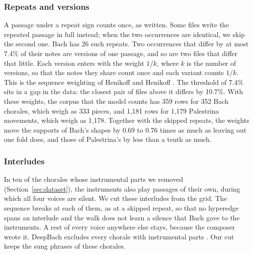 \subsubsection{Repeats and versions}
A passage under a repeat sign counts once, as written. Some files write the repeated passage in full instead; when the two occurrences are identical, we skip the second one. Bach has 26 such repeats. Two occurrences that differ by at most 7.4\% of their notes are versions of one passage, and so are two files that differ that little. Each version enters with the weight $1/k$, where $k$ is the number of versions, so that the notes they share count once and each variant counts $1/k$. This is the sequence weighting of Henikoff and Henikoff \cite{henikoff1994}. The threshold of 7.4\% sits in a gap in the data: the closest pair of files above it differs by 10.7\%. With these weights, the corpus that the model counts has 359 rows for 352 Bach chorales, which weigh as 333 pieces, and 1,181 rows for 1,179 Palestrina movements, which weigh as 1,178. Together with the skipped repeats, the weights move the supports of Bach's shapes by 0.69 to 0.76 times as much as leaving out one fold does, and those of Palestrina's by less than a tenth as much.

\subsubsection{Interludes}
In ten of the chorales whose instrumental parts we removed (Section~\ref{sec:dataset}), the instruments also play passages of their own, during which all four voices are silent. We cut these interludes from the grid. The sequence breaks at each of them, as at a skipped repeat, so that no hyperedge spans an interlude and the walk does not learn a silence that Bach gave to the instruments. A rest of every voice anywhere else stays, because the composer wrote it. DeepBach excludes every chorale with instrumental parts \cite{hadjeres2017}. Our cut keeps the sung phrases of these chorales.

